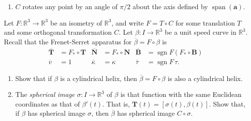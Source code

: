 \documentclass[12 pt, letterpaper]{hmcpset}
\begin{document}
\begin{solution}
\begin{enumerate}
			Using both of these, we can see that $C$ preserves distances. Specifically, 
			\[
				\begin{split}
					d(C(\mathbf{p}), C(\mathbf{q})) & = \lVert C(\mathbf{p}) - C(\mathbf{q}) \rVert \\
									& = \lVert C(\mathbf{p} - \mathbf{q}) \rVert \\
									& = \lVert \mathbf{p} - \mathbf{q} \rVert \\
									& = d(\mathbf{p}, \mathbf{q}).
				\end{split}
			\] 

			Since $C$ preserves norms and distances, it is an orthogonal transformation.
		\item $C$ rotates any point by an angle of $\pi/2$ about the axis defined by $\operatorname{span}(\mathbf{a})$.
	\end{enumerate}
\end{solution}

\pagebreak

\begin{problem}[Problem 4.]
	Let $F : \mathbb{R}^{3} \to \mathbb{R}^{3}$ be an isometry of $\mathbb{R}^{3}$, and write $F = T \circ C$ for some translation $T$ and some orthogonal transformation $C$. Let $\beta : I \to \mathbb{R}^{3}$ be a unit speed curve in $\mathbb{R}^{3}$. Recall that the Frenet-Serret apparatus for $\overline{\beta} = F \circ \beta$ is
	\begin{align*}
		\overline{\mathbf{T}} & = F_{*} \circ \mathbf{T} & \overline{\mathbf{N}} & = F_{*} \circ \mathbf{N} & \overline{\mathbf{B}} & = \operatorname{sgn} F (F_{*} \circ \mathbf{B}) \\
		\overline{v} & = 1 & \overline{\kappa} & = \kappa & \overline{\tau} & = \operatorname{sgn} F \, \tau.
	\end{align*}
	\begin{enumerate}
		\item Show that if $\beta$ is a cylindrical helix, then $\overline{\beta} = F \circ \beta$ is also a cylindrical helix.
		\item The \textit{spherical image} $\sigma : I \to \mathbb{R}^{3}$ of $\beta$ is that function with the same Euclidean coordinates as that of $\beta'(t)$. That is, $\mathbf{T}(t) = [\sigma(t), \beta(t)]$. Show that, if $\beta$ has spherical image $\sigma$, then $\overline{\beta}$ has spherical image $C \circ \sigma$.
	\end{enumerate}
\end{problem}
\end{document}
